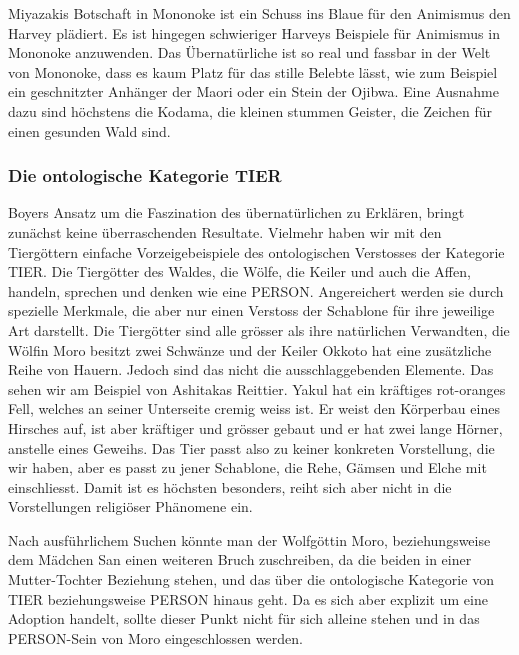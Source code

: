 Miyazakis Botschaft in Mononoke ist ein Schuss ins Blaue für den Animismus den Harvey plädiert. Es ist hingegen schwieriger Harveys Beispiele für Animismus in Mononoke anzuwenden. Das Übernatürliche ist so real und fassbar in der Welt von Mononoke, dass es kaum Platz für das stille Belebte lässt, wie zum Beispiel ein geschnitzter Anhänger der Maori oder ein Stein der Ojibwa. Eine Ausnahme dazu sind höchstens die Kodama, die kleinen stummen Geister, die Zeichen für einen gesunden Wald sind. 

\subsubsection{Die ontologische Kategorie TIER} 
Boyers Ansatz um die Faszination des übernatürlichen zu Erklären, bringt zunächst keine überraschenden Resultate. Vielmehr haben wir mit den Tiergöttern einfache Vorzeigebeispiele des ontologischen Verstosses der Kategorie TIER. Die Tiergötter des Waldes, die Wölfe, die Keiler und auch die Affen, handeln, sprechen und denken wie eine PERSON. Angereichert werden sie durch spezielle Merkmale, die aber nur einen Verstoss der Schablone für ihre jeweilige Art darstellt. Die Tiergötter sind alle grösser als ihre natürlichen Verwandten, die Wölfin Moro besitzt zwei Schwänze und der Keiler Okkoto hat eine zusätzliche Reihe von Hauern. Jedoch sind das nicht die ausschlaggebenden Elemente. Das sehen wir am Beispiel von Ashitakas Reittier. Yakul hat ein kräftiges rot-oranges Fell, welches an seiner Unterseite cremig weiss ist. Er weist den Körperbau eines Hirsches auf, ist aber kräftiger und grösser gebaut und er hat zwei lange Hörner, anstelle eines Geweihs. Das Tier passt also zu keiner konkreten Vorstellung, die wir haben, aber es passt zu jener Schablone, die Rehe, Gämsen und Elche mit einschliesst. Damit ist es höchsten besonders, reiht sich aber nicht in die Vorstellungen religiöser Phänomene ein. 

Nach ausführlichem Suchen könnte man der Wolfgöttin Moro, beziehungsweise dem Mädchen San einen weiteren Bruch zuschreiben, da die beiden in einer Mutter-Tochter Beziehung stehen, und das über die ontologische Kategorie von TIER beziehungsweise PERSON hinaus geht. Da es sich aber explizit um eine Adoption handelt, sollte dieser Punkt nicht für sich alleine stehen und in das PERSON-Sein von Moro eingeschlossen werden. 

